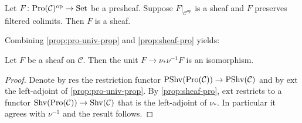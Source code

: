 \begin{proposition}
    Let $F \colon \mathrm{Pro}(\mathcal{C})^{\mathrm{op}} \to \mathrm{Set}$ be a presheaf. Suppose
    $F|_{\mathcal{C}^{\mathrm{op}}}$ is a sheaf and $F$ preserves filtered colimits. Then
    $F$ is a sheaf.
    \label{prop:sheaf-pro}
\end{proposition}

Combining \ref{prop:pro-univ-prop} and \ref{prop:sheaf-pro} yields:

\begin{corollary}
    Let $F$ be a sheaf on $\mathcal{C}$. Then the unit $F \to \nu_{*} \nu^{-1} F$ is an isomorphism.
    \label{cor:pro-direct-image-unit-iso}
\end{corollary}

\begin{proof}
    Denote by $\mathrm{res}$ the restriction functor
    $\mathrm{PShv}(\mathrm{Pro}(\mathcal{C})) \to \mathrm{PShv}(\mathcal{C})$ and by
    $\mathrm{ext}$ the left-adjoint of \ref{prop:pro-univ-prop}. By \ref{prop:sheaf-pro},
    $\mathrm{ext}$ restricts to a functor $\mathrm{Shv}(\mathrm{Pro}(\mathcal{C})) \to \mathrm{Shv}(\mathcal{C})$
    that is the left-adjoint of $\nu_*$. In particular it agrees with $\nu^{-1}$ and
    the result follows.
\end{proof}
